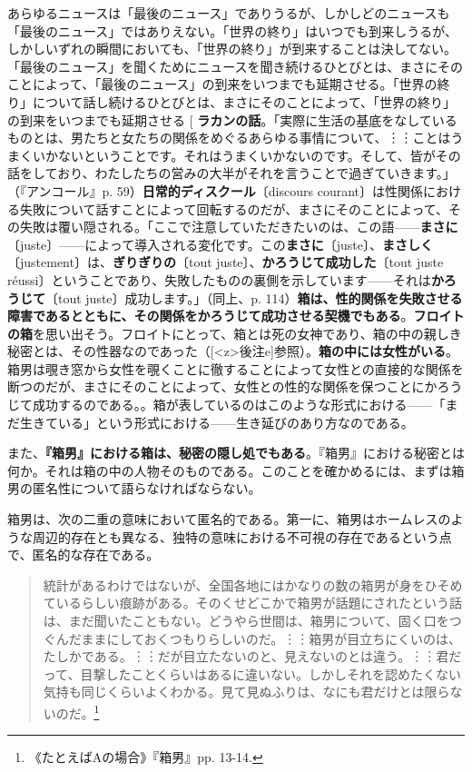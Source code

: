 \documentclass[b5j,twoside,twocolumn]{utarticle}
\makeatletter
\def\yakuchu{%
\@ifnextchar[\@xfootnote %
{\stepcounter{yakuchu}%
\protected@xdef\@thefnmark{\theyakuchu}%
\@footnotemark\@footnotetext}}
\makeatother
\begin{document}
あらゆるニュースは「最後のニュース」でありうるが、しかしどのニュースも「最後のニュース」ではありえない。「世界の終り」はいつでも到来しうるが、しかしいずれの瞬間においても、「世界の終り」が到来することは決してない。「最後のニュース」を聞くためにニュースを聞き続けるひとびとは、まさにそのことによって、「最後のニュース」の到来をいつまでも延期させる。「世界の終り」について話し続けるひとびとは、まさにそのことによって、「世界の終り」の到来をいつまでも延期させる\yakuchu{\textbf{ラカンの話}。「実際に生活の基底をなしているものとは、男たちと女たちの関係をめぐるあらゆる事情について、︙︙ことはうまくいかないということです。それはうまくいかないのです。そして、皆がその話をしており、わたしたちの営みの大半がそれを言うことで過ぎていきます。」（『アンコール』p. 59）\textbf{日常的ディスクール}〔discours courant〕は性関係における失敗について話すことによって回転するのだが、まさにそのことによって、その失敗は覆い隠される。「ここで注意していただきたいのは、この語------\textbf{まさに}〔juste〕------によって導入される変化です。この\textbf{まさに}〔juste〕、\textbf{まさしく}〔justement〕は、\textbf{ぎりぎりの}〔tout juste〕、\textbf{かろうじて成功した}〔tout juste r\'eussi〕ということであり、失敗したものの裏側を示しています------それは\textbf{かろうじて}〔tout juste〕成功します。」（同上、p. 114）\textbf{箱は、性的関係を失敗させる障害であるとともに、その関係をかろうじて成功させる契機でもある}。\textbf{フロイトの箱}を思い出そう。フロイトにとって、箱とは死の女神であり、箱の中の親しき秘密とは、その性器なのであった（[\pbox<z>{後注e}]参照）。\textbf{箱の中には女性がいる}。箱男は覗き窓から女性を覗くことに徹することによって女性との直接的な関係を断つのだが、まさにそのことによって、女性との性的な関係を保つことにかろうじて成功するのである。}。箱が表しているのはこのような形式における------「まだ生きている」という形式における------生き延びのあり方なのである。

また、\textbf{『箱男』における箱は、秘密の隠し処でもある}。『箱男』における秘密とは何か。それは箱の中の人物そのものである。このことを確かめるには、まずは箱男の匿名性について語らなければならない。

箱男は、次の二重の意味において匿名的である。第一に、箱男はホームレスのような周辺的存在とも異なる、独特の意味における不可視の存在であるという点で、匿名的な存在である。

\begin{quotation}
統計があるわけではないが、全国各地にはかなりの数の箱男が身をひそめているらしい痕跡がある。そのくせどこかで箱男が話題にされたという話は、まだ聞いたこともない。どうやら世間は、箱男について、固く口をつぐんだままにしておくつもりらしいのだ。︙︙箱男が目立ちにくいのは、たしかである。︙︙だが目立たないのと、見えないのとは違う。︙︙君だって、目撃したことくらいはあるに違いない。しかしそれを認めたくない気持も同じくらいよくわかる。見て見ぬふりは、なにも君だけとは限らないのだ。\footnote{《たとえばAの場合》『箱男』pp. 13-14.}
\end{quotation}
\end{document}
